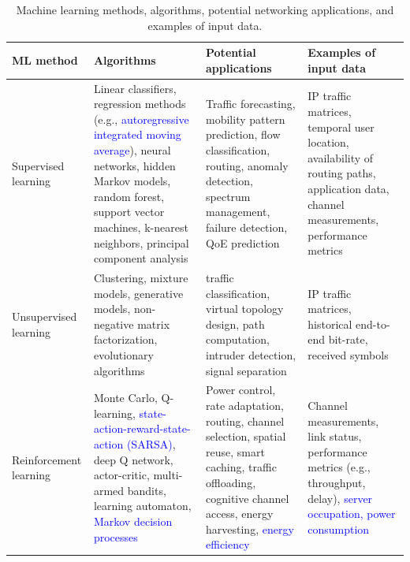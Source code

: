 \documentclass[journal]{IEEEtran}
\begin{document}
%
\IEEEpeerreviewmaketitle

\begin{table}[t!]
	\caption{Machine learning methods, algorithms, potential networking applications, and examples of input data.}
	\label{table:ml_taxonomy}
	\centering
	\begin{tabular}{|p{}|p{}|p{}|p{}|}
		\hline
		\textbf{ML method} & \textbf{Algorithms} & \textbf{Potential applications} & \textbf{Examples of input data} \\\hline
		Supervised learning & Linear classifiers, regression methods (e.g., \textcolor{blue}{autoregressive integrated moving average}), neural networks, hidden Markov models, random forest, support vector machines, k-nearest neighbors, principal component analysis &Traffic forecasting, mobility pattern prediction, flow classification, routing, anomaly detection, spectrum management, failure detection, QoE prediction & IP traffic matrices, temporal user location, availability of routing paths, application data, channel measurements, performance metrics \\\hline
		Unsupervised learning & Clustering, mixture models, generative models, non-negative matrix factorization, evolutionary algorithms & traffic classification, virtual topology design, path computation, intruder detection, signal separation& IP traffic matrices, historical end-to-end bit-rate, received symbols \\\hline
		Reinforcement learning & Monte Carlo, Q-learning, \textcolor{blue}{state-action-reward-state-action (SARSA)}, deep Q network, actor-critic, multi-armed bandits, learning automaton, \textcolor{blue}{Markov decision processes} & Power control, rate adaptation, routing, channel selection, spatial reuse, smart caching, traffic offloading, cognitive channel access, energy harvesting, \textcolor{blue}{energy efficiency} & Channel measurements, link status, performance metrics (e.g., throughput, delay), \textcolor{blue}{server occupation, power consumption} \\\hline
	\end{tabular}
\end{table}
\end{document}
